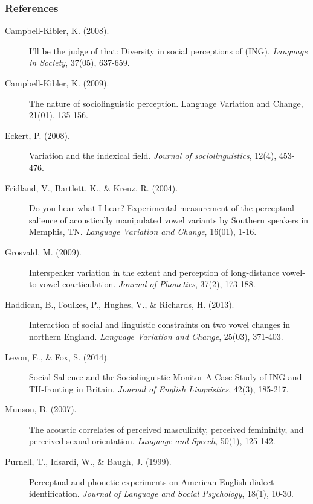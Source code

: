 \documentclass[a0,final]{a0poster}
\begin{document}
\begin{multicols}{4}
\vspace*{-1.5cm}
\subsubsection*{References}
\vspace*{-.5cm}
\scriptsize
\begin{description}
\item[Campbell-Kibler, K. (2008).]{I'll be the judge of that: Diversity in social perceptions of (ING). \textit{Language in Society}, 37(05), 637-659.}\vspace*{0.2cm}

\item[Campbell-Kibler, K. (2009).]{The nature of sociolinguistic perception. Language Variation and Change, 21(01), 135-156.}

\item[Eckert, P. (2008).]{Variation and the indexical field. \textit{Journal of sociolinguistics}, 12(4), 453-476.}\vspace*{0.2cm}

\item[Fridland, V., Bartlett, K., \& Kreuz, R. (2004).]{Do you hear what I hear? Experimental measurement of the perceptual salience of acoustically manipulated vowel variants by Southern speakers in Memphis, TN. \textit{Language Variation and Change}, 16(01), 1-16.}\vspace*{0.2cm}

\item[Grosvald, M. (2009).]{Interspeaker variation in the extent and perception of long-distance vowel-to-vowel coarticulation. \textit{Journal of Phonetics}, 37(2), 173-188.}

\item[Haddican, B., Foulkes, P., Hughes, V., \& Richards, H. (2013).]{Interaction of social and linguistic constraints on two vowel changes in northern England. \textit{Language Variation and Change}, 25(03), 371-403.}

\item[Levon, E., \& Fox, S. (2014).]{ Social Salience and the Sociolinguistic Monitor A Case Study of ING and TH-fronting in Britain. \textit{Journal of English Linguistics}, 42(3), 185-217.}

\item[Munson, B. (2007).]{The acoustic correlates of perceived masculinity, perceived femininity, and perceived sexual orientation. \textit{Language and Speech}, 50(1), 125-142.}

\item[Purnell, T., Idsardi, W., \& Baugh, J. (1999).]{ Perceptual and phonetic experiments on American English dialect identification. \textit{Journal of Language and Social Psychology}, 18(1), 10-30.}


\end{description}
%
%

\end{multicols}
\end{document}
